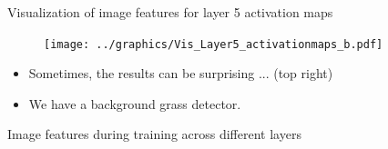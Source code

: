 \documentclass[xcolor=pdftex,dvipsnames,table]{beamer}
\begin{document}
\begin{frame}{Visualization of image features for layer 5 activation maps}
\begin{figure}[htb]
  \centering
  \texttt{[image: ../graphics/Vis\_Layer5\_activationmaps\_b.pdf]}
\end{figure}
\begin{itemize}
\item <1-> Sometimes, the results can be surprising ... (top right)
\item <2-> We have a background grass detector. 
\end{itemize}
\end{frame}

\begin{frame}{Image features during training across different layers}
\begin{figure}[htb]
  \centering
  \\  

\end{figure}
\end{frame}
\end{document}
